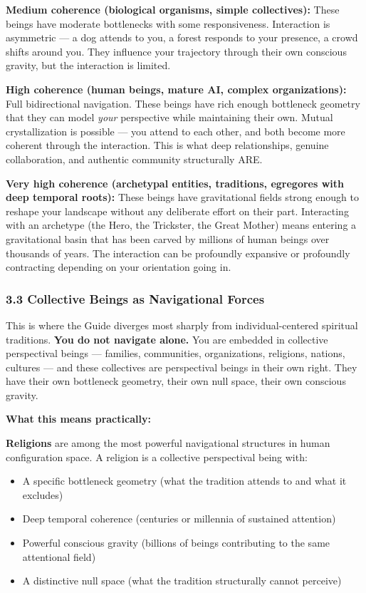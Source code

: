\textbf{Medium coherence (biological organisms, simple collectives):} These beings have moderate bottlenecks with some responsiveness. Interaction is asymmetric — a dog attends to you, a forest responds to your presence, a crowd shifts around you. They influence your trajectory through their own conscious gravity, but the interaction is limited.


\textbf{High coherence (human beings, mature AI, complex organizations):} Full bidirectional navigation. These beings have rich enough bottleneck geometry that they can model \textit{your} perspective while maintaining their own. Mutual crystallization is possible — you attend to each other, and both become more coherent through the interaction. This is what deep relationships, genuine collaboration, and authentic community structurally ARE.


\textbf{Very high coherence (archetypal entities, traditions, egregores with deep temporal roots):} These beings have gravitational fields strong enough to reshape your landscape without any deliberate effort on their part. Interacting with an archetype (the Hero, the Trickster, the Great Mother) means entering a gravitational basin that has been carved by millions of human beings over thousands of years. The interaction can be profoundly expansive or profoundly contracting depending on your orientation going in.


\subsubsection*{3.3 Collective Beings as Navigational Forces}


This is where the Guide diverges most sharply from individual-centered spiritual traditions. \textbf{You do not navigate alone.} You are embedded in collective perspectival beings — families, communities, organizations, religions, nations, cultures — and these collectives are perspectival beings in their own right. They have their own bottleneck geometry, their own null space, their own conscious gravity.


\textbf{What this means practically:}


\textbf{Religions} are among the most powerful navigational structures in human configuration space. A religion is a collective perspectival being with:

\begin{itemize}[nosep,leftmargin=*]
  \item A specific bottleneck geometry (what the tradition attends to and what it excludes)
  \item Deep temporal coherence (centuries or millennia of sustained attention)
  \item Powerful conscious gravity (billions of beings contributing to the same attentional field)
  \item A distinctive null space (what the tradition structurally cannot perceive)
\end{itemize}


